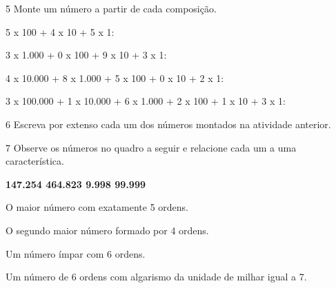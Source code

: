 
\num{5} Monte um número a partir de cada composição.

\begin{escolha}
\item 5 x 100 + 4 x 10 + 5 x 1: 

\item 3 x 1.000 + 0 x 100 + 9 x 10 + 3 x 1: 

\item 4 x 10.000 + 8 x 1.000 + 5 x 100 + 0 x 10 + 2 x 1: 

\item 3 x 100.000 + 1 x 10.000 + 6 x 1.000 + 2 x 100 + 1 x 10 + 3 x 1: 
\end{escolha}

\num{6} Escreva por extenso cada um dos números montados na atividade anterior.

\begin{escolha}
\item {}

\item {}

\item {}

\item {}
\end{escolha}

\num{7} Observe os números no quadro a seguir e relacione cada um a uma característica.

\begin{mdframed}[linewidth=2pt,linecolor=azul!20,backgroundcolor=azul!20,roundcorner=2pt]
\textbf{147.254 \hfill 464.823 \hfill 9.998 \hfill 99.999}
\end{mdframed}

\pagebreak
\begin{escolha}
\item O maior número com exatamente 5 ordens. 

\item O segundo maior número formado por 4 ordens. 

\item Um número ímpar com 6 ordens. 

\item Um número de 6 ordens com algarismo da unidade de milhar igual a 7. 
\end{escolha}

